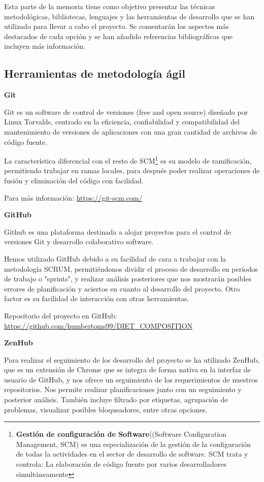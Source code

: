 
Esta parte de la memoria tiene como objetivo presentar las técnicas metodológicas, bibliotecas, lenguajes y las herramientas de desarrollo que se han utilizado para llevar a cabo el proyecto. Se comentarán los aspectos más destacados de cada opción y se han añadido referencias bibliográficas que incluyen más información.

\subsection{Herramientas de metodología ágil}
\textbf{Git}

Git es un software de control de versiones (free and open source) diseñado por Linux Torvalds, centrado en la eficiencia, confiabilidad y compatibilidad del mantenimiento de versiones de aplicaciones con una gran cantidad de archivos de código fuente. 

La característica diferencial con el resto de SCM\footnote{\textbf{Gestión de configuración de Software}((Software Configuration Management, SCM) es una especialización de la gestión de la configuración de todas la actividades en el sector de desarrollo de software. SCM trata y controla: La elaboración de código fuente por varios desarrolladores simultáneamente} es su modelo de ramificación, permitiendo trabajar en ramas locales, para después poder realizar operaciones de fusión y eliminación del código con facilidad.


Para más información: \url{https://git-scm.com/}

\textbf{GitHub} 

Github es una plataforma destinada a alojar proyectos para el control de versiones Git y desarrollo colaborativo software. 

Hemos utilizado GitHub debido a su facilidad de cara a trabajar con la metodología SCRUM, permitiéndonos dividir el proceso de desarrollo en períodos de trabajo o "sprints", y realizar análisis posteriores que nos mostrarán posibles errores de planificación y aciertos en cuanto al desarrollo del proyecto. Otro factor es su facilidad de interacción con otras herramientas.

Repositorio del proyecto en GitHub: \url{https://github.com/humbertoms99/DIET_COMPOSITION}

\textbf{ZenHub}

Para realizar el seguimiento de los desarrollo del proyecto se ha utilizado ZenHub, que es un extensión de Chrome que se integra de forma nativa en la interfaz de usuario de GitHub, y nos  ofrece un seguimiento de los requerimientos de nuestros repositorios. Nos permite realizar planificaciones junto con un seguimiento y posterior análisis. También incluye filtrado por etiquetas, agrupación de problemas, visualizar posibles bloqueadores, entre otras opciones. 

